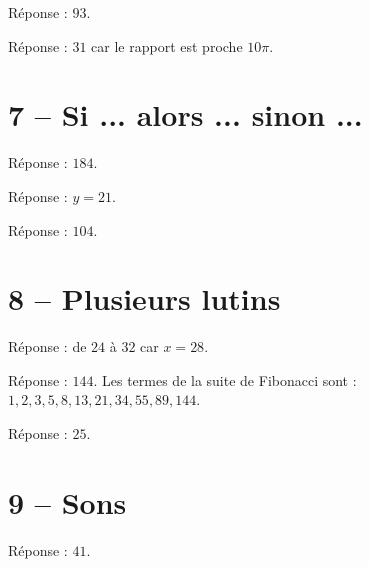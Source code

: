 \documentclass[class=report,crop=false, 12pt]{standalone}
\begin{document}
\begin{enigme}
Réponse : $93$.
\end{enigme}

\begin{enigme}
Réponse : $31$ car le rapport est proche $10 \pi$.
\end{enigme}


\section*{7 -- Si ... alors ... sinon ...}

\setcounter{enigme}{0}

\begin{enigme}
Réponse : $184$.
\end{enigme}

\begin{enigme}
Réponse : $y = 21$.
\end{enigme}

\begin{enigme}
Réponse : $104$.
\end{enigme}


\section*{8 -- Plusieurs lutins}

\setcounter{enigme}{0}

\begin{enigme}
Réponse : de $24$ à $32$ car $x= 28$.
\end{enigme}

\begin{enigme}
Réponse : $144$. Les termes de la suite de Fibonacci sont : $1,2,3,5,8,13,21,34,55,89,144$.
\end{enigme}

\begin{enigme}
Réponse : $25$. 
\end{enigme}


\section*{9 -- Sons}

\setcounter{enigme}{0}

\begin{enigme}
Réponse : $41$.
\end{enigme}
\end{document}
